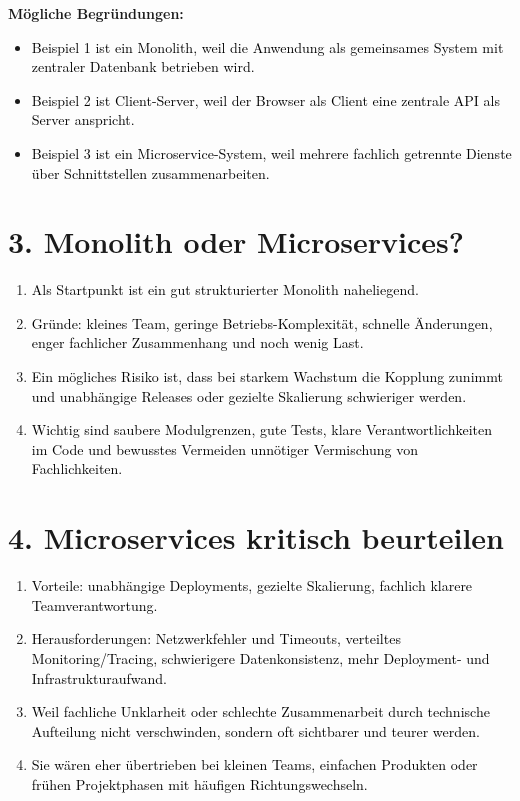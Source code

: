 \documentclass[11pt,a4paper]{article}
\newcommand{\solution}[1]{\textcolor{black}{#1}}
\begin{document}
\textbf{Mögliche Begründungen:}
\begin{itemize}
  \item \solution{Beispiel 1 ist ein Monolith, weil die Anwendung als gemeinsames System mit zentraler Datenbank betrieben wird.}
  \item \solution{Beispiel 2 ist Client-Server, weil der Browser als Client eine zentrale API als Server anspricht.}
  \item \solution{Beispiel 3 ist ein Microservice-System, weil mehrere fachlich getrennte Dienste über Schnittstellen zusammenarbeiten.}
\end{itemize}

\section*{3. Monolith oder Microservices?}
\begin{enumerate}
  \item \solution{Als Startpunkt ist ein gut strukturierter Monolith naheliegend.}
  \item \solution{Gründe: kleines Team, geringe Betriebs-Komplexität, schnelle Änderungen, enger fachlicher Zusammenhang und noch wenig Last.}
  \item \solution{Ein mögliches Risiko ist, dass bei starkem Wachstum die Kopplung zunimmt und unabhängige Releases oder gezielte Skalierung schwieriger werden.}
  \item \solution{Wichtig sind saubere Modulgrenzen, gute Tests, klare Verantwortlichkeiten im Code und bewusstes Vermeiden unnötiger Vermischung von Fachlichkeiten.}
\end{enumerate}

\section*{4. Microservices kritisch beurteilen}
\begin{enumerate}
  \item \solution{Vorteile: unabhängige Deployments, gezielte Skalierung, fachlich klarere Teamverantwortung.}
  \item \solution{Herausforderungen: Netzwerkfehler und Timeouts, verteiltes Monitoring/Tracing, schwierigere Datenkonsistenz, mehr Deployment- und Infrastrukturaufwand.}
  \item \solution{Weil fachliche Unklarheit oder schlechte Zusammenarbeit durch technische Aufteilung nicht verschwinden, sondern oft sichtbarer und teurer werden.}
  \item \solution{Sie wären eher übertrieben bei kleinen Teams, einfachen Produkten oder frühen Projektphasen mit häufigen Richtungswechseln.}
\end{enumerate}
\end{document}
